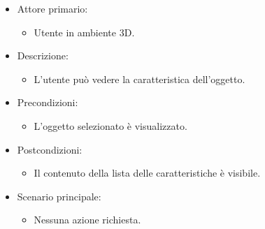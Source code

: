 \begin{itemize}

	\item Attore primario: 
	\begin{itemize}
		\item Utente in ambiente 3D.
	\end{itemize}
	\item Descrizione:
	\begin{itemize}
		\item L'utente può vedere la caratteristica dell'oggetto.
	\end{itemize}
	
	\item Precondizioni:
	\begin{itemize}
		\item L'oggetto selezionato è visualizzato.
	\end{itemize}
	
	\item Postcondizioni:
	\begin{itemize}
		\item Il contenuto della lista delle caratteristiche è visibile.
	\end{itemize}
	
	\item Scenario principale:
	\begin{itemize}
		\item Nessuna azione richiesta.
	\end{itemize}
	
\end{itemize}

